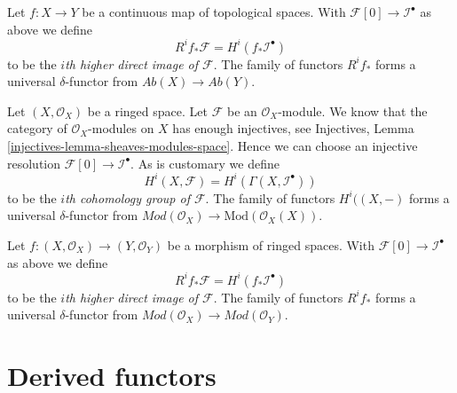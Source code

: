 \medskip\noindent
Let $f : X \to Y$ be a continuous map of topological spaces. With
$\mathcal{F}[0] \to \mathcal{I}^\bullet$ as above
we define
\begin{equation}
\label{equation-higher-direct-image}
R^if_*\mathcal{F} = H^i(f_*\mathcal{I}^\bullet)
\end{equation}
to be the {\it $i$th higher direct image of $\mathcal{F}$}.
The family of functors $R^if_*$ forms a universal $\delta$-functor
from $\textit{Ab}(X) \to \textit{Ab}(Y)$.

\medskip\noindent
Let $(X, \mathcal{O}_X)$ be a ringed space. Let $\mathcal{F}$ be an
$\mathcal{O}_X$-module. We know that the category of $\mathcal{O}_X$-modules
on $X$ has enough injectives, see
Injectives, Lemma \ref{injectives-lemma-sheaves-modules-space}.
Hence we can choose an injective resolution
$\mathcal{F}[0] \to \mathcal{I}^\bullet$. As is customary we define
\begin{equation}
\label{equation-cohomology-modules}
H^i(X, \mathcal{F}) = H^i(\Gamma(X, \mathcal{I}^\bullet))
\end{equation}
to be the {\it $i$th cohomology group of $\mathcal{F}$}.
The family of functors $H^i((X, -)$ forms a universal $\delta$-functor
from $\textit{Mod}(\mathcal{O}_X) \to \text{Mod}(\mathcal{O}_X(X))$.

\medskip\noindent
Let $f : (X, \mathcal{O}_X) \to (Y, \mathcal{O}_Y)$ be a morphism of ringed
spaces. With $\mathcal{F}[0] \to \mathcal{I}^\bullet$ as above
we define
\begin{equation}
\label{equation-higher-direct-image-modules}
R^if_*\mathcal{F} = H^i(f_*\mathcal{I}^\bullet)
\end{equation}
to be the {\it $i$th higher direct image of $\mathcal{F}$}.
The family of functors $R^if_*$ forms a universal $\delta$-functor
from $\textit{Mod}(\mathcal{O}_X) \to \textit{Mod}(\mathcal{O}_Y)$.





\section{Derived functors}
\label{section-derived-functors}

